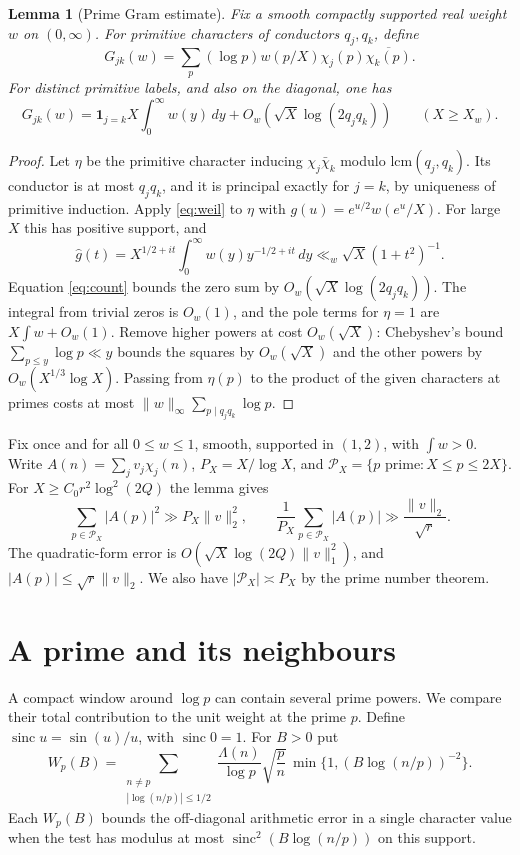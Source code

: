 \documentclass[11pt]{article}
\newtheorem{lemma}[theorem]{Lemma}
\newcommand{\dd}{\,d}\DeclareMathOperator{\sinc}{sinc}
\newcommand{\calP}{\mathcal P}\newcommand{\wh}{\widehat}
\begin{document}
\begin{lemma}[Prime Gram estimate]\label{lem:gram}
Fix a smooth compactly supported real weight $w$ on $(0,\infty)$.
For primitive characters of conductors $q_j,q_k$, define
\[
 G_{jk}(w)=\sum_p(\log p)w(p/X)\chi_j(p)\overline{\chi_k(p)} .
\]
For distinct primitive labels, and also on the diagonal, one has
\[
 G_{jk}(w)=\mathbf1_{j=k}X\int_0^\infty w(y)\dd y
          +O_w\!\left(\sqrt X\log(2q_jq_k)\right)\qquad (X\ge X_w).
\]
\end{lemma}
\begin{proof}
Let $\eta$ be the primitive character inducing
$\chi_j\bar\chi_k$ modulo $\mathrm{lcm}(q_j,q_k)$. Its conductor is at
most $q_jq_k$, and it is principal exactly for $j=k$, by uniqueness of
primitive induction. Apply \eqref{eq:weil} to $\eta$ with
$g(u)=e^{u/2}w(e^u/X)$. For large $X$ this has positive support, and
\[
 \wh g(t)=X^{1/2+it}\int_0^\infty w(y)y^{-1/2+it}\dd y
       \ll_w \sqrt X(1+t^2)^{-1}.
\]
Equation \eqref{eq:count} bounds the zero sum by $O_w(\sqrt X\log(2q_jq_k))$.
The integral from trivial zeros is $O_w(1)$, and the pole terms for
$\eta=1$ are $X\int w+O_w(1)$. Remove higher powers at cost $O_w(\sqrt X)$:
Chebyshev's bound $\sum_{p\le y}\log p\ll y$ bounds the squares by
$O_w(\sqrt X)$ and the other powers by $O_w(X^{1/3}\log X)$.
Passing from $\eta(p)$ to the product of the given characters at primes
costs at most $\|w\|_\infty\sum_{p\mid q_jq_k}\log p$.
\end{proof}

Fix once and for all $0\le w\le1$, smooth, supported in $(1,2)$, with
$\int w>0$. Write $A(n)=\sum_j v_j\chi_j(n)$,
$P_X=X/\log X$, and $\calP_X=\{p\text{ prime}:X\le p\le2X\}$.
For $X\ge C_0r^2\log^2(2Q)$ the lemma gives
\begin{equation}\label{eq:rms}
 \sum_{p\in\calP_X}|A(p)|^2\gg P_X\|v\|_2^2,\qquad
 \frac1{P_X}\sum_{p\in\calP_X}|A(p)|\gg\frac{\|v\|_2}{\sqrt r}.
\end{equation}
The quadratic-form error is
$O(\sqrt X\log(2Q)\|v\|_1^2)$, and $|A(p)|\le\sqrt r\|v\|_2$.
We also have $|\calP_X|\asymp P_X$ by the prime number theorem.

\section{A prime and its neighbours}
A compact window around $\log p$ can contain several prime powers. We compare
their total contribution to the unit weight at the prime $p$.
Define $\sinc u=\sin(u)/u$, with $\sinc 0=1$. For $B>0$ put
\begin{equation}\label{eq:leak}
 W_p(B)=\sum_{\substack{n\ne p\\ |\log(n/p)|\le1/2}}
  \frac{\Lambda(n)}{\log p}\sqrt{\frac pn}\,
  \min\{1,(B\log(n/p))^{-2}\}.
\end{equation}
Each $W_p(B)$ bounds the off-diagonal arithmetic error in a single character value
when the test has modulus at most $\sinc^2(B\log(n/p))$ on this support.
\end{document}
